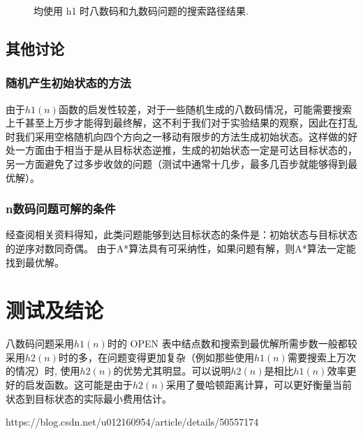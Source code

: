 \begin{figure}
\caption{\label{fig:final}均使用 h1 时八数码和九数码问题的搜索路径结果.}
\end{figure}


\subsection{其他讨论}
\subsubsection{随机产生初始状态的方法}
由于$h1(n)$函数的启发性较差，对于一些随机生成的八数码情况，可能需要搜索上千甚至上万步才能得到最终解，这不利于我们对于实验结果的观察，因此在打乱时我们采用空格随机向四个方向之一移动有限步的方法生成初始状态。这样做的好处一方面由于相当于是从目标状态逆推，生成的初始状态一定是可达目标状态的，另一方面避免了过多步收敛的问题（测试中通常十几步，最多几百步就能够得到最优解）。

\subsubsection{n数码问题可解的条件}
经查阅相关资料得知，此类问题能够到达目标状态的条件是：初始状态与目标状态的逆序对数同奇偶。\cite{condition} 由于A*算法具有可采纳性，如果问题有解，则A*算法一定能找到最优解。



\section{测试及结论}

八数码问题采用$h1(n)$时的 OPEN 表中结点数和搜索到最优解所需步数一般都较采用$h2(n)$时的多，在问题变得更加复杂（例如那些使用$h1(n)$需要搜索上万次的情况）时, 使用$h2(n)$的优势尤其明显。可以说明$h2(n)$是相比$h1(n)$效率更好的启发函数。这可能是由于$h2(n)$采用了曼哈顿距离计算，可以更好衡量当前状态到目标状态的实际最小费用估计。




\begin{thebibliography}{}
 https://blog.csdn.net/u012160954/article/details/50557174
\end{thebibliography}
